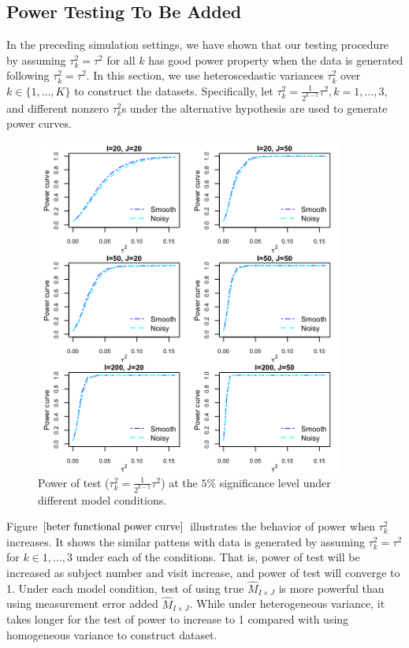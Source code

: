 \subsection{Power Testing To Be Added}
In the preceding simulation settings, we have shown that our testing procedure by assuming $\tau_k^2=\tau^2$ for all $k$ has good power property when the data is generated following  $\tau_k^2=\tau^2$. In this section, we use heteroscedastic variances $\tau_k^2$ over $k \in \{1,\dots, K\}$ to construct the datasets. Specifically, let $\tau_k^2=\frac{1}{2^{k-1}}\tau^2, k=1,\dots, 3$, and different nonzero $\tau_k^2$s  under the alternative hypothesis are used to generate power curves. 

\begin{figure}[h!]
\centering
\includegraphics[width=0.9\textwidth]{heter_power_curve.png}
\caption{Power of test ($\tau_k^2=\frac{1}{2^{k-1}}\tau^2$) at the $5\%$ significance level under different model conditions.}
\label{heter functional power curve}
\end{figure}

Figure $\ref{heter functional power curve}$ illustrates the behavior of power when $\tau_k^2$ increases. It shows the similar pattens with data is generated by assuming $\tau_k^2=\tau^2$ for $k \in {1,\dots,3}$ under each of the conditions. That is, power of test will be increased as subject number and visit increase, and power of test will converge to 1. Under each model condition, test of using true $\hat{M}_{I\times J}$ is more powerful than using measurement error added $\hat{M}_{I\times J}$. While under heterogeneous variance, it takes longer for the test of power to increase to 1 compared with using homogeneous variance to construct dataset. 

